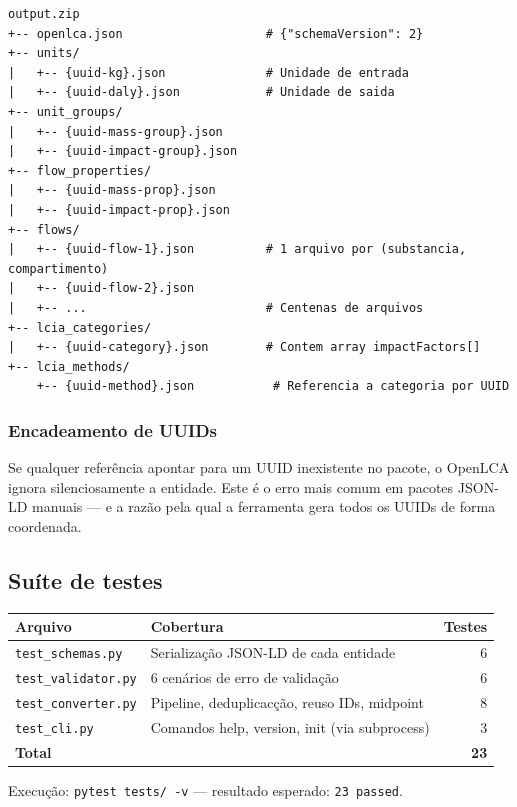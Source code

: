 \begin{lstlisting}
output.zip
+-- openlca.json                    # {"schemaVersion": 2}
+-- units/
|   +-- {uuid-kg}.json              # Unidade de entrada
|   +-- {uuid-daly}.json            # Unidade de saida
+-- unit_groups/
|   +-- {uuid-mass-group}.json
|   +-- {uuid-impact-group}.json
+-- flow_properties/
|   +-- {uuid-mass-prop}.json
|   +-- {uuid-impact-prop}.json
+-- flows/
|   +-- {uuid-flow-1}.json          # 1 arquivo por (substancia, compartimento)
|   +-- {uuid-flow-2}.json
|   +-- ...                         # Centenas de arquivos
+-- lcia_categories/
|   +-- {uuid-category}.json        # Contem array impactFactors[]
+-- lcia_methods/
    +-- {uuid-method}.json           # Referencia a categoria por UUID
\end{lstlisting}

\subsubsection{Encadeamento de UUIDs}

Se qualquer refer\^encia apontar para um UUID inexistente no pacote, o OpenLCA ignora silenciosamente a entidade. Este \'e o erro mais comum em pacotes JSON-LD manuais --- e a raz\~ao pela qual a ferramenta gera todos os UUIDs de forma coordenada.

\subsection{Su\'ite de testes}

\begin{table}[H]
\centering
\begin{tabular}{llr}
\toprule
\textbf{Arquivo} & \textbf{Cobertura} & \textbf{Testes} \\
\midrule
\texttt{test\_schemas.py} & Serializa\c{c}\~ao JSON-LD de cada entidade & 6 \\
\texttt{test\_validator.py} & 6 cen\'arios de erro de valida\c{c}\~ao & 6 \\
\texttt{test\_converter.py} & Pipeline, deduplicac\c{c}\~ao, reuso IDs, midpoint & 8 \\
\texttt{test\_cli.py} & Comandos help, version, init (via subprocess) & 3 \\
\midrule
\textbf{Total} & & \textbf{23} \\
\bottomrule
\end{tabular}
\end{table}

Execu\c{c}\~ao: \lstinline[style=bash]{pytest tests/ -v} --- resultado esperado: \texttt{23 passed}.

